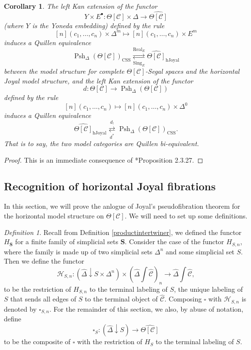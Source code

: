 \documentclass[leqno]{article}
\numberwithin{equation}{subsection}
\theoremstyle{plain}   %
\newtheorem{cor}[equation]{Corollary}
\theoremstyle{remark}
\newtheorem{defn}[equation]{Definition}
\theoremstyle{plain}
\DeclareMathOperator{\Psh}{Psh}
\newcommand{\overcat}[2]{{\left(#1\downarrow #2\right)}}
\newcommand{\psh}[1]{\ensuremath{\widehat{#1}}}
\newcommand{\C}{\ensuremath{\mathcal{C}}}
\newcommand{\cellset}{\ensuremath{\widehat{\Theta[\mathcal{C}]}}}
\newcommand{\ssetlab}{\ensuremath{\widehat{\Delta} \int \widehat{\mathcal{C}}}}
\begin{document}
\begin{cor}
	The left Kan extension of the functor \[Y \times E^\bullet:\Theta[\C]\times \Delta \to \cellset\] (where \(Y\) is the Yoneda embedding) defined by the rule 
	\[[n](c_1,\dots,c_n)\times \Delta^m \mapsto [n](c_1,\dots,c_n) \times E^m\]
	induces a Quillen equivalence
	\[\Psh_\Delta(\Theta[\C])_{\mathrm{CSS}} \underset{\operatorname{Sing}_E}{\overset{\operatorname{Real}_E}{\rightleftarrows}} \cellset_{\mathrm{hJoyal}}\]
	between the model structure for complete \(\Theta[\C]\)-Segal spaces and the horizontal Joyal model structure,
	and the left Kan extension of the functor 
	\[d:\Theta[\C] \to \Psh_\Delta(\Theta[\C])\]
	defined by the rule
	\[[n](c_1,\dots,c_n) \mapsto [n](c_1,\dots,c_n) \times \Delta^0\]
	induces a Quillen equivalence
	\[\cellset_{\mathrm{hJoyal}} \underset{d^\ast}{\overset{d_!}{\rightleftarrows}} \Psh_\Delta(\Theta[\C])_{\mathrm{CSS}}.\]
	That is to say, the two model categories are Quillen bi-equivalent.
\end{cor}
\begin{proof} This is an immediate consequence of \cite{cisinski-book}*{Proposition 2.3.27}.
\end{proof}

\subsection{Recognition of horizontal Joyal fibrations}\label{admissible}
In this section, we will prove the anlogue of Joyal's pseudofibration theorem for the horizontal model structure on \(\Theta[\C]\).  We will need to set up some definitions.

\begin{defn}
	Recall from Definition \ref{productintertwiner}, we defined the functor \(H_\mathbf{S}\) for a finite family of simplicial sets \(\mathbf{S}\).  Consider the case of the functor \(H_{S,n}\), where the family is made up of two simplicial sets \(\Delta^n\) and some simplicial set \(S\).  Then we define the functor 
	\[\mathcal{H}_{S,n}: \overcat{\psh{\Delta}}{S\times \Delta^n} \times  \left(\ssetlab\right)_{n} \to \ssetlab,\]
	to be the restriction of \(H_{S,n}\) to the terminal labeling of \(S\), the unique labeling of \(S\) that sends all edges of \(S\) to the terminal object of \(\psh{\C}\).   Composing \(\square\) with \(\mathcal{H}_{S,n}\) is denoted by \(\square_{S,n}\).  For the remainder of this section, we also, by abuse of notation, define 
	\[\square_S:\overcat{\psh{\Delta}}{S} \to \cellset\]
	to be the composite of \(\square\) with the restriction of \(H_S\) to the terminal labeling of \(S\).  
\end{defn}
\end{document}
